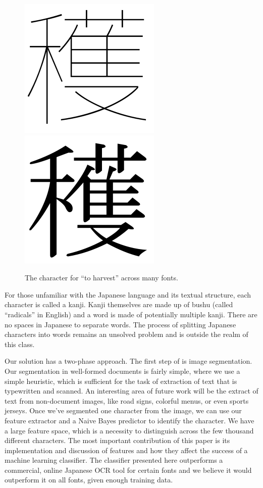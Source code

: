 \documentclass[10pt,twocolumn,letterpaper]{article}
\begin{document}
\begin{figure}[t]
    \includegraphics[width=0.4\columnwidth]{../data/kanji-Chogokubo/kanji_225.png}
    \includegraphics[width=0.4\columnwidth]{../data/kanji-Mincho/kanji_225.png}
    \caption{The character for ``to harvest'' across many fonts.}
\end{figure}

For those unfamiliar with the Japanese language and its textual structure, each character is called a kanji. Kanji themselves are made up of bushu (called “radicals” in English) and a word is made of potentially multiple kanji. There are no spaces in Japanese to separate words. The process of splitting Japanese characters into words remains an unsolved problem and is outside the realm of this class.

Our solution has a two-phase approach. The first step of is image segmentation. Our segmentation in well-formed documents is fairly simple, where we use a simple heuristic, which is sufficient for the task of extraction of text that is typewritten and scanned. An interesting area of future work will be the extract of text from non-document images, like road signs, colorful menus, or even sports jerseys. Once we’ve segmented one character from the image, we can use our feature extractor and a Naive Bayes predictor to identify the character. We have a large feature space, which is a necessity to distinguish across the few thousand different characters. The most important contribution of this paper is its implementation and discussion of features and how they affect the success of a machine learning classifier. The classifier presented here outperforms a commercial, online Japanese OCR tool for certain fonts and we believe it would outperform it on all fonts, given enough training data.
\end{document}
